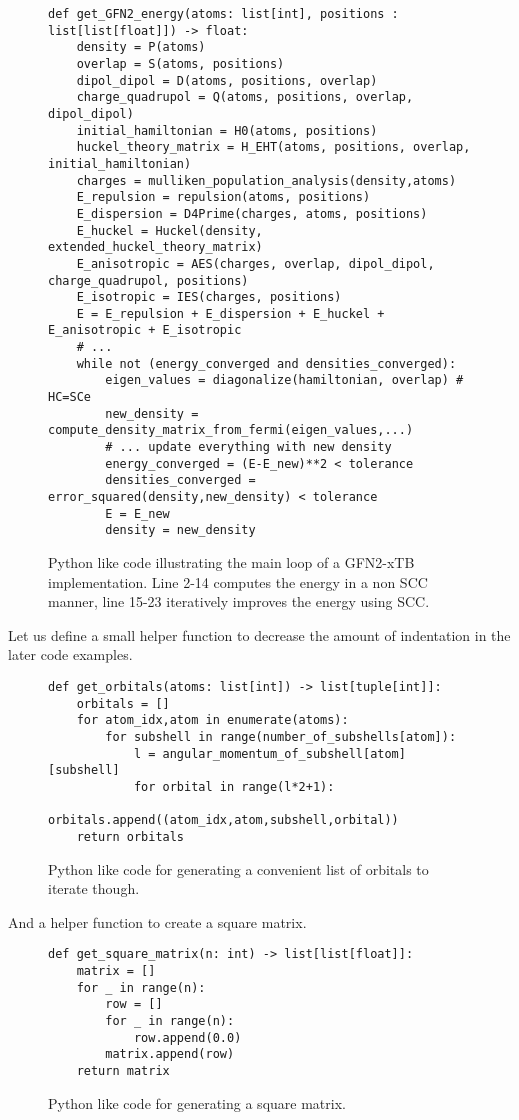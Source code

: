 \begin{figure}[H]
\begin{verbatim}
def get_GFN2_energy(atoms: list[int], positions : list[list[float]]) -> float:
    density = P(atoms)
    overlap = S(atoms, positions)
    dipol_dipol = D(atoms, positions, overlap)
    charge_quadrupol = Q(atoms, positions, overlap, dipol_dipol)
    initial_hamiltonian = H0(atoms, positions)
    huckel_theory_matrix = H_EHT(atoms, positions, overlap, initial_hamiltonian)
    charges = mulliken_population_analysis(density,atoms)
    E_repulsion = repulsion(atoms, positions)
    E_dispersion = D4Prime(charges, atoms, positions)
    E_huckel = Huckel(density, extended_huckel_theory_matrix)
    E_anisotropic = AES(charges, overlap, dipol_dipol, charge_quadrupol, positions)
    E_isotropic = IES(charges, positions)
    E = E_repulsion + E_dispersion + E_huckel + E_anisotropic + E_isotropic
    # ...
    while not (energy_converged and densities_converged):
        eigen_values = diagonalize(hamiltonian, overlap) # HC=SCe 
        new_density = compute_density_matrix_from_fermi(eigen_values,...)
        # ... update everything with new density
        energy_converged = (E-E_new)**2 < tolerance
        densities_converged = error_squared(density,new_density) < tolerance
        E = E_new
        density = new_density
\end{verbatim}
\caption{Python like code illustrating the main loop of a GFN2-xTB implementation.
Line 2-14 computes the energy in a non SCC manner, line 15-23 iteratively improves the energy using SCC.
}
\end{figure}
Let us define a small helper function to decrease the amount of indentation in the later code examples. 
\begin{figure}[H]
\begin{verbatim}
def get_orbitals(atoms: list[int]) -> list[tuple[int]]:
    orbitals = []
    for atom_idx,atom in enumerate(atoms):
        for subshell in range(number_of_subshells[atom]):
            l = angular_momentum_of_subshell[atom][subshell] 
            for orbital in range(l*2+1):
                orbitals.append((atom_idx,atom,subshell,orbital))
    return orbitals
\end{verbatim}
\caption{Python like code for generating a convenient list of orbitals to iterate though. }
\end{figure}
And a helper function to create a square matrix.
\begin{figure}[H]
\begin{verbatim}
def get_square_matrix(n: int) -> list[list[float]]:
    matrix = []
    for _ in range(n):
        row = []
        for _ in range(n):
            row.append(0.0)
        matrix.append(row)
    return matrix
\end{verbatim}
\caption{Python like code for generating a square matrix.}
\end{figure}


